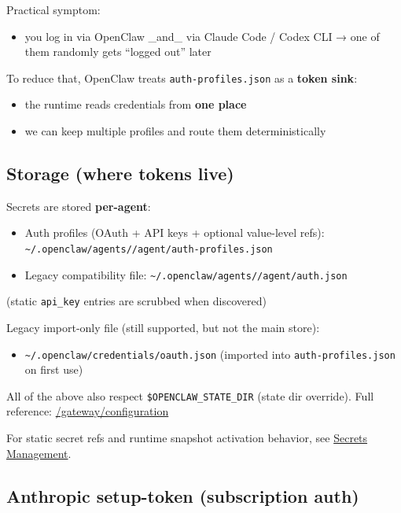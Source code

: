 Practical symptom:

\begin{itemize}
  \item you log in via OpenClaw \_and\_ via Claude Code / Codex CLI → one of them randomly gets “logged out” later
\end{itemize}


To reduce that, OpenClaw treats \texttt{auth-profiles.json} as a \textbf{token sink}:

\begin{itemize}
  \item the runtime reads credentials from \textbf{one place}
  \item we can keep multiple profiles and route them deterministically
\end{itemize}


\subsection{Storage (where tokens live)}


Secrets are stored \textbf{per-agent}:

\begin{itemize}
  \item Auth profiles (OAuth + API keys + optional value-level refs): \texttt{\textasciitilde{}/.openclaw/agents//agent/auth-profiles.json}
  \item Legacy compatibility file: \texttt{\textasciitilde{}/.openclaw/agents//agent/auth.json}
\end{itemize}

(static \texttt{api\_key} entries are scrubbed when discovered)

Legacy import-only file (still supported, but not the main store):

\begin{itemize}
  \item \texttt{\textasciitilde{}/.openclaw/credentials/oauth.json} (imported into \texttt{auth-profiles.json} on first use)
\end{itemize}


All of the above also respect \texttt{\$OPENCLAW\_STATE\_DIR} (state dir override). Full reference: \href{/gateway/configuration\#auth-storage-oauth--api-keys}{/gateway/configuration}

For static secret refs and runtime snapshot activation behavior, see \href{/gateway/secrets}{Secrets Management}.

\subsection{Anthropic setup-token (subscription auth)}



